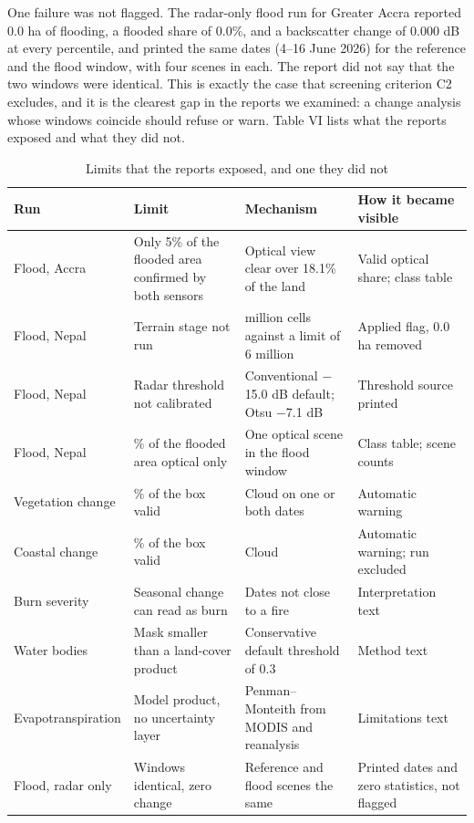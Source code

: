 \documentclass[conference]{IEEEtran}
\newlength{\tabw}
\begin{document}
One failure was not flagged. The radar-only flood run for Greater Accra reported 0.0 ha of flooding, a flooded share of 0.0\%, and a backscatter change of 0.000 dB at every percentile, and printed the same dates (4--16 June 2026) for the reference and the flood window, with four scenes in each. The report did not say that the two windows were identical. This is exactly the case that screening criterion C2 excludes, and it is the clearest gap in the reports we examined: a change analysis whose windows coincide should refuse or warn. Table VI lists what the reports exposed and what they did not.

\begin{table}[!t]
\caption{Limits that the reports exposed, and one they did not}
\centering
{\footnotesize\setlength{\tabcolsep}{2.5pt}\renewcommand{\arraystretch}{1.12}\setlength{\tabw}{\dimexpr\textwidth-8\tabcolsep\relax}
\begin{tabular}{>{\raggedright\arraybackslash}p{}>{\raggedright\arraybackslash}p{}>{\raggedright\arraybackslash}p{}>{\raggedright\arraybackslash}p{}}
\toprule
\textbf{Run} & \textbf{Limit} & \textbf{Mechanism} & \textbf{How it became visible} \\
\midrule
Flood, Accra & Only 5\% of the flooded area confirmed by both sensors & Optical view clear over 18.1\% of the land & Valid optical share; class table \\
Flood, Nepal & Terrain stage not run & 13.5 million cells against a limit of 6 million & Applied flag, 0.0 ha removed \\
Flood, Nepal & Radar threshold not calibrated & Conventional $-$15.0 dB default; Otsu $-$7.1 dB & Threshold source printed \\
Flood, Nepal & 90\% of the flooded area optical only & One optical scene in the flood window & Class table; scene counts \\
Vegetation change & 44.2\% of the box valid & Cloud on one or both dates & Automatic warning \\
Coastal change & 1.7\% of the box valid & Cloud & Automatic warning; run excluded \\
Burn severity & Seasonal change can read as burn & Dates not close to a fire & Interpretation text \\
Water bodies & Mask smaller than a land-cover product & Conservative default threshold of 0.3 & Method text \\
Evapotranspiration & Model product, no uncertainty layer & Penman--Monteith from MODIS and reanalysis & Limitations text \\
Flood, radar only & Windows identical, zero change & Reference and flood scenes the same & Printed dates and zero statistics, not flagged \\
\bottomrule
\end{tabular}
}
\end{table}
\end{document}
